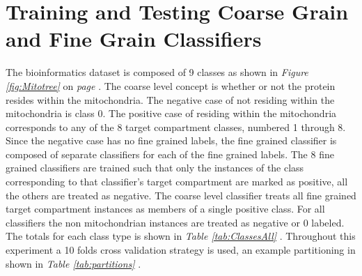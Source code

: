 \documentclass[ms]{nuthesis}
\begin{document}
\section{Training and Testing Coarse Grain and Fine Grain Classifiers}
\par The bioinformatics dataset is composed of 9 classes as shown in
\textit{Figure \ref{fig:Mitotree} } on \textit{page \pageref{fig:Mitotree}}. The coarse level concept is whether or not
the protein resides within the mitochondria. The negative case of not residing within the mitochondria is class 0. The positive case of residing within the
  mitochondria corresponds to any of the 8 target compartment classes,  numbered 1 through 8. Since the
  negative case has no fine grained labels, the fine grained classifier is composed of separate classifiers
  for each of the fine grained labels. The 8 fine grained classifiers are trained such that only the instances of
  the class corresponding to that classifier's target compartment are marked as positive, all the others are treated
  as negative. The coarse level classifier treats all fine grained target compartment
  instances as members of a single positive class. For all classifiers the non mitochondrian instances are treated as
  negative or 0 labeled. The totals for each class type is shown in \textit{Table \ref{tab:ClassesAll} }. Throughout
  this experiment a 10 folds cross validation strategy is used, an example partitioning in shown in
  \textit{Table \ref{tab:partitions} }.
\end{document}
